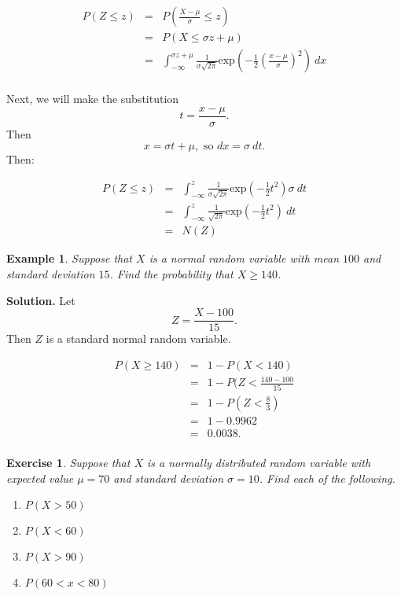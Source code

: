 \documentclass[letterpaper,10pt]{article}
\newtheorem{ex}{Exercise}
\newtheorem{exa}{Example}[section]
\begin{document}
\begin{eqnarray*}
P(Z\leq z)&=&P\left(\frac{X-\mu}{\sigma}\leq z\right)\\
&=&P\left(X\leq \sigma z+\mu\right)\\
&=&\int_{-\infty}^{\sigma z+\mu}\frac{1}{\sigma\sqrt{2\pi}}\text{exp}\left(-\frac{1}{2}\left(\frac{x-\mu}{\sigma}\right)^2\right)\:dx\\
\end{eqnarray*}

\noindent Next, we will make the substitution $$t=\frac{x-\mu}{\sigma}.$$  Then $$x=\sigma t+\mu,\text{ so }dx=\sigma\:dt.$$  Then:

\begin{eqnarray*}
P(Z\leq z)&=&\int_{-\infty}^z\frac{1}{\sigma\sqrt{2\pi}}\text{exp}\left(-\frac{1}{2}t^2\right)\sigma\:dt\\
&=&\int_{-\infty}^z\frac{1}{\sqrt{2\pi}}\text{exp}\left(-\frac{1}{2}t^2\right)\:dt\\
&=&N(Z)
\end{eqnarray*}


\begin{exa}
Suppose that $X$ is a normal random variable with mean $100$ and standard deviation $15$.  Find the probability that $X\geq 140$.
\end{exa}

\noindent\textbf{Solution.} Let $$Z=\frac{X-100}{15}.$$  Then $Z$ is a standard normal random variable.

\begin{eqnarray*}
P(X\geq 140)&=&1-P(X<140)\\
&=&1-P(Z<\frac{140-100}{15}\\
&=&1-P(Z<\frac{8}{3})\\
&=&1-0.9962\\
&=&0.0038.\\
\end{eqnarray*}

\begin{ex}
Suppose that $X$ is a normally distributed random variable with expected value $\mu=70$ and standard deviation $\sigma=10$.  Find each of the following.
\begin{enumerate}

\item $P(X>50)$
\item $P(X<60)$
\item $P(X>90)$
\item $P(60<x<80)$

\end{enumerate}
\end{ex}
\end{document}
